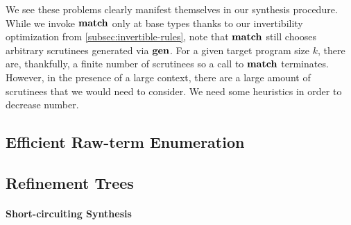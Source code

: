We see these problems clearly manifest themselves in our synthesis procedure.
While we invoke $\mathbf{match}$ only at base types thanks to our invertibility optimization from \autoref{subsec:invertible-rules}, note that $\mathbf{match}$ still chooses arbitrary scrutinees generated via $\mathbf{gen}$.
For a given target program size $k$, there are, thankfully, a finite number of scrutinees so a call to $\mathbf{match}$ terminates.
However, in the presence of a large context, there are a large amount of scrutinees that we would need to consider.
We need some heuristics in order to decrease number.



\subsection{Efficient Raw-term Enumeration}
\label{subsec:efficient-raw-term-enumeration}




\subsection{Refinement Trees}
\label{subsec:refinement-trees}


\paragraph{Short-circuiting Synthesis}

